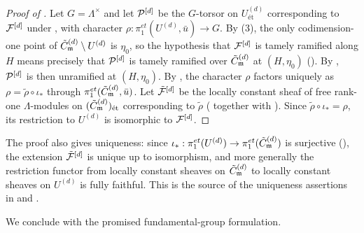 \begin{proof}[Proof of ]
    Let $G = \Lambda^\times$ and let $\mathcal{P}^{[d]}$ be the $G$-torsor on $U^{(d)}_{\text{\'et}}$
    corresponding to $\mathcal{F}^{[d]}$ under , with character
    $\rho : \pi_1^{et}(U^{(d)}, \bar{u}) \to G$.
    By (3), the only codimension-one point of
    $\tilde{C}_{\mathfrak{m}}^{(d)} \setminus U^{(d)}$ is $\eta_0$, so the hypothesis that $\mathcal{F}^{[d]}$ is tamely ramified
    along $H$ means precisely that $\mathcal{P}^{[d]}$ is tamely ramified over $\tilde{C}_{\mathfrak{m}}^{(d)}$ at $(H, \eta_0)$
    ().
    By , $\mathcal{P}^{[d]}$ is then unramified at
    $(H, \eta_0)$. By , the character $\rho$ factors uniquely as
    $\rho = \tilde{\rho} \circ \iota_*$ through
    $\pi_1^{et}(\tilde{C}_{\mathfrak{m}}^{(d)}, \bar{u})$. Let $\tilde{\mathcal{F}}^{[d]}$ be the locally constant sheaf of free
    rank-one $\Lambda$-modules on $(\tilde{C}_{\mathfrak{m}}^{(d)})_{\text{\'et}}$ corresponding to $\tilde{\rho}$
    ( together with
    ). Since $\tilde{\rho} \circ \iota_* = \rho$, its restriction
    to $U^{(d)}$ is isomorphic to $\mathcal{F}^{[d]}$.
\end{proof}

\begin{rem*}
    The proof also gives uniqueness: since
    $\iota_* : \pi_1^{et}(U^{(d)}) \to \pi_1^{et}(\tilde{C}_{\mathfrak{m}}^{(d)})$ is surjective
    (), the extension $\tilde{\mathcal{F}}^{[d]}$ is unique up to
    isomorphism, and more generally the restriction functor from locally constant sheaves on
    $\tilde{C}_{\mathfrak{m}}^{(d)}$ to locally constant sheaves on $U^{(d)}$ is fully faithful. This is the source
    of the uniqueness assertions in  and .
\end{rem*}

We conclude with the promised fundamental-group formulation.

